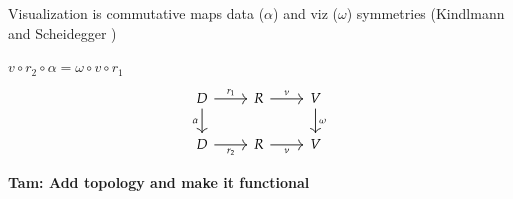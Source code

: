 \documentclass[xcolor={dvipsnames}, handout]{beamer}
\begin{document}
\begin{frame}{Visualization is commutative maps}
    data ($\alpha$) and viz ($\omega$) symmetries (Kindlmann and Scheidegger \cite{kindlmann2014algebraic})
        \begin{block}{$v\circ r_2 \circ \alpha =\omega\circ v\circ r_1$}
            \begin{equation*}
            \begin{tikzcd}[ampersand replacement=\&]
                D \arrow[d, "\alpha"'] \arrow[r, "r_1"] \& R \arrow[r, "\nu"]  \& V \arrow[d, "\omega"] \\
                D \arrow[r, "r_2"']                     \& R \arrow[r, "\nu"'] \& V                    
            \end{tikzcd}
        \end{equation*}
    \end{block}
    \pause
    \begin{center}
        \textbf{Tam: Add topology and make it functional}
    \end{center}
\end{frame}
\end{document}
